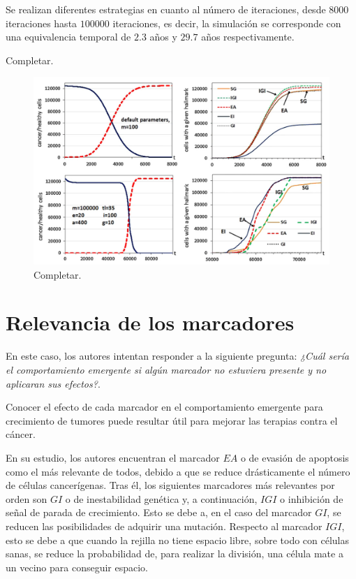 Se realizan diferentes estrategias en cuanto al número de iteraciones, desde $8000$ iteraciones
hasta $100000$ iteraciones, es decir, la simulación se corresponde con una equivalencia temporal
de $2.3$ años y $29.7$ años respectivamente.

Completar.

\begin{figure}[h]
\centering
\includegraphics[scale=0.5]{figures/experiments/exp5}
\caption{Completar.}
\end{figure}

\section{Relevancia de los marcadores}

En este caso, los autores intentan responder a la siguiente pregunta: \textit{¿Cuál sería
el comportamiento emergente si algún marcador no estuviera presente y no aplicaran
sus efectos?}.

Conocer el efecto de cada marcador en el comportamiento emergente para crecimiento de tumores
puede resultar útil para mejorar las terapias contra el cáncer.

En su estudio, los autores encuentran el marcador $EA$ o de evasión de apoptosis como el más
relevante de todos, debido a que se reduce drásticamente el número de células cancerígenas.
Tras él, los siguientes marcadores más relevantes por orden son $GI$ o de inestabilidad genética y,
a continuación, $IGI$ o inhibición de señal de parada de crecimiento. Esto se debe a, en el caso
del marcador $GI$, se reducen las posibilidades de adquirir una mutación. Respecto al marcador $IGI$,
esto se debe a que cuando la rejilla no tiene espacio libre, sobre todo con células sanas, se reduce
la probabilidad de, para realizar la división, una célula mate a un vecino para conseguir espacio.

